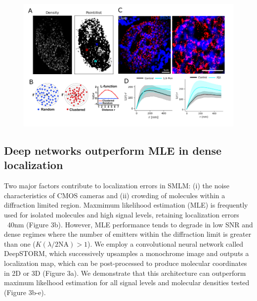 \documentclass{ucetd}
\begin{document}
\begin{figure}
\begin{center}
\includegraphics[width=18cm]{BRD4-Results.png}
\end{center}
\end{figure}


\subsection{Deep networks outperform MLE in dense localization}

Two major factors contribute to localization errors in SMLM: (i) the noise characteristics of CMOS cameras and (ii) crowding of molecules within a diffraction limited region. Maxmimum likelihood estimation (MLE) is frequently used for isolated molecules and high signal levels, retaining localization errors ~40nm (Figure 3b). However, MLE performance tends to degrade in low SNR and dense regimes where the number of emitters within the diffraction limit is greater than one ($K(\lambda/2\mathrm{NA}) > 1$). We employ a convolutional neural network called DeepSTORM, which successively upsamples a monochrome image and outputs a localization map, which can be post-processed to produce molecular coordinates in 2D or 3D (Figure 3a).  We demonstrate that this architecture can outperform maximum likelhood estimation for all signal levels and molecular densities tested (Figure 3b-e).
\end{document}
